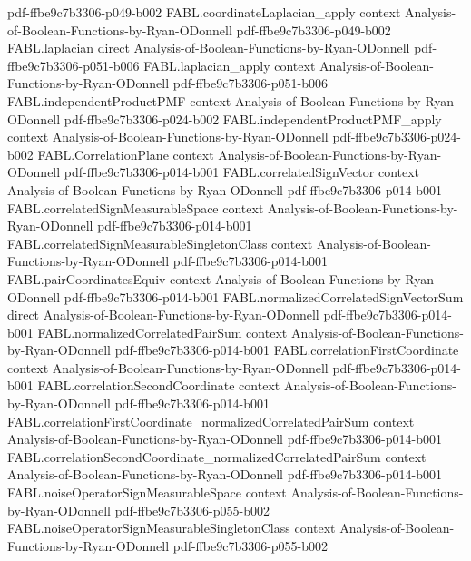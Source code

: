 \begin{theorem}
  {pdf-ffbe9c7b3306-p049-b002}
\proofstep
  {FABL.coordinateLaplacian_apply}
  {context}
  {Analysis-of-Boolean-Functions-by-Ryan-ODonnell}
  {pdf-ffbe9c7b3306-p049-b002}
\proofstep
  {FABL.laplacian}
  {direct}
  {Analysis-of-Boolean-Functions-by-Ryan-ODonnell}
  {pdf-ffbe9c7b3306-p051-b006}
\proofstep
  {FABL.laplacian_apply}
  {context}
  {Analysis-of-Boolean-Functions-by-Ryan-ODonnell}
  {pdf-ffbe9c7b3306-p051-b006}
\proofstep
  {FABL.independentProductPMF}
  {context}
  {Analysis-of-Boolean-Functions-by-Ryan-ODonnell}
  {pdf-ffbe9c7b3306-p024-b002}
\proofstep
  {FABL.independentProductPMF_apply}
  {context}
  {Analysis-of-Boolean-Functions-by-Ryan-ODonnell}
  {pdf-ffbe9c7b3306-p024-b002}
\proofstep
  {FABL.CorrelationPlane}
  {context}
  {Analysis-of-Boolean-Functions-by-Ryan-ODonnell}
  {pdf-ffbe9c7b3306-p014-b001}
\proofstep
  {FABL.correlatedSignVector}
  {context}
  {Analysis-of-Boolean-Functions-by-Ryan-ODonnell}
  {pdf-ffbe9c7b3306-p014-b001}
\proofstep
  {FABL.correlatedSignMeasurableSpace}
  {context}
  {Analysis-of-Boolean-Functions-by-Ryan-ODonnell}
  {pdf-ffbe9c7b3306-p014-b001}
\proofstep
  {FABL.correlatedSignMeasurableSingletonClass}
  {context}
  {Analysis-of-Boolean-Functions-by-Ryan-ODonnell}
  {pdf-ffbe9c7b3306-p014-b001}
\proofstep
  {FABL.pairCoordinatesEquiv}
  {context}
  {Analysis-of-Boolean-Functions-by-Ryan-ODonnell}
  {pdf-ffbe9c7b3306-p014-b001}
\proofstep
  {FABL.normalizedCorrelatedSignVectorSum}
  {direct}
  {Analysis-of-Boolean-Functions-by-Ryan-ODonnell}
  {pdf-ffbe9c7b3306-p014-b001}
\proofstep
  {FABL.normalizedCorrelatedPairSum}
  {context}
  {Analysis-of-Boolean-Functions-by-Ryan-ODonnell}
  {pdf-ffbe9c7b3306-p014-b001}
\proofstep
  {FABL.correlationFirstCoordinate}
  {context}
  {Analysis-of-Boolean-Functions-by-Ryan-ODonnell}
  {pdf-ffbe9c7b3306-p014-b001}
\proofstep
  {FABL.correlationSecondCoordinate}
  {context}
  {Analysis-of-Boolean-Functions-by-Ryan-ODonnell}
  {pdf-ffbe9c7b3306-p014-b001}
\proofstep
  {FABL.correlationFirstCoordinate_normalizedCorrelatedPairSum}
  {context}
  {Analysis-of-Boolean-Functions-by-Ryan-ODonnell}
  {pdf-ffbe9c7b3306-p014-b001}
\proofstep
  {FABL.correlationSecondCoordinate_normalizedCorrelatedPairSum}
  {context}
  {Analysis-of-Boolean-Functions-by-Ryan-ODonnell}
  {pdf-ffbe9c7b3306-p014-b001}
\proofstep
  {FABL.noiseOperatorSignMeasurableSpace}
  {context}
  {Analysis-of-Boolean-Functions-by-Ryan-ODonnell}
  {pdf-ffbe9c7b3306-p055-b002}
\proofstep
  {FABL.noiseOperatorSignMeasurableSingletonClass}
  {context}
  {Analysis-of-Boolean-Functions-by-Ryan-ODonnell}
  {pdf-ffbe9c7b3306-p055-b002}

\end{theorem}
